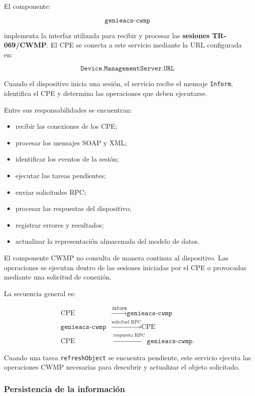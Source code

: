El componente:

\[
    \texttt{genieacs-cwmp}
\]

implementa la interfaz utilizada para recibir y procesar las
\textbf{sesiones TR-069/CWMP}. El CPE se conecta a este servicio mediante
la URL configurada en:

\[
    \texttt{Device.ManagementServer.URL}
\]

Cuando el dispositivo inicia una sesión, el servicio recibe el mensaje
\texttt{Inform}, identifica el CPE y determina las operaciones que deben
ejecutarse.

Entre sus responsabilidades se encuentran:

\begin{itemize}
    \item recibir las conexiones de los CPE;
    \item procesar los mensajes SOAP y XML;
    \item identificar los eventos de la sesión;
    \item ejecutar las tareas pendientes;
    \item enviar solicitudes RPC;
    \item procesar las respuestas del dispositivo;
    \item registrar errores y resultados;
    \item actualizar la representación almacenada del modelo de datos.
\end{itemize}

El componente CWMP no consulta de manera continua al dispositivo. Las
operaciones se ejecutan dentro de las sesiones iniciadas por el CPE o
provocadas mediante una solicitud de conexión.

La secuencia general es:

\[
\begin{aligned}
    \text{CPE}
    &\xrightarrow{\texttt{Inform}}
    \texttt{genieacs-cwmp}\\
    \texttt{genieacs-cwmp}
    &\xrightarrow{\text{solicitud RPC}}
    \text{CPE}\\
    \text{CPE}
    &\xrightarrow{\text{respuesta RPC}}
    \texttt{genieacs-cwmp}.
\end{aligned}
\]

Cuando una tarea \texttt{refreshObject} se encuentra pendiente, este
servicio ejecuta las operaciones CWMP necesarias para descubrir y
actualizar el objeto solicitado.


\subsubsection*{Persistencia de la información}

